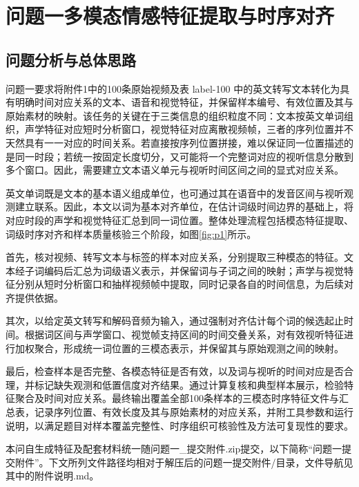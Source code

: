 
\clearpage

\section{问题一\hspace{1em}多模态情感特征提取与时序对齐}

\subsection{问题分析与总体思路}

问题一要求将附件1中的100条原始视频及表 label-100 中的英文转写文本转化为具有明确时间对应关系的文本、语音和视觉特征，并保留样本编号、有效位置及其与原始素材的映射。该任务的关键在于三类信息的组织粒度不同：文本按英文单词组织，声学特征对应短时分析窗口，视觉特征对应离散视频帧，三者的序列位置并不天然具有一一对应的时间关系。若直接按序列位置拼接，难以保证同一位置描述的是同一时段；若统一按固定长度切分，又可能将一个完整词对应的视听信息分散到多个窗口。因此，需要建立文本语义单元与视听时间区间之间的显式对应关系。

英文单词既是文本的基本语义组成单位，也可通过其在语音中的发音区间与视听观测建立联系。因此，本文以词为基本对齐单位，在估计词级时间边界的基础上，将对应时段的声学和视觉特征汇总到同一词位置。整体处理流程包括模态特征提取、词级时序对齐和样本质量核验三个阶段，如图\ref{fig:p1}所示。

首先，核对视频、转写文本与标签的样本对应关系，分别提取三种模态的特征。文本经子词编码后汇总为词级语义表示，并保留词与子词之间的映射；声学与视觉特征分别从短时分析窗口和抽样视频帧中提取，同时记录各自的时间信息，为后续对齐提供依据。

其次，以给定英文转写和解码音频为输入，通过强制对齐估计每个词的候选起止时间。根据词区间与声学窗口、视觉帧支持区间的时间交叠关系，对有效视听特征进行加权聚合，形成统一词位置的三模态表示，并保留其与原始观测之间的映射。

最后，检查样本是否完整、各模态特征是否有效，以及词与视听的时间对应是否合理，并标记缺失观测和低置信度对齐结果。通过计算复核和典型样本展示，检验特征聚合及时间对应关系。最终输出覆盖全部100条样本的三模态时序特征文件与汇总表，记录序列位置、有效长度及其与原始素材的对应关系，并附工具参数和运行说明，以满足题目对样本覆盖完整性、时序组织可核验性及方法可复现性的要求。

本问自生成特征及配套材料统一随\textnormal{问题一\_提交附件.zip}提交，以下简称“问题一提交附件”。下文所列文件路径均相对于解压后的\textnormal{问题一提交附件/}目录，文件导航见其中的\textnormal{附件说明.md}。


